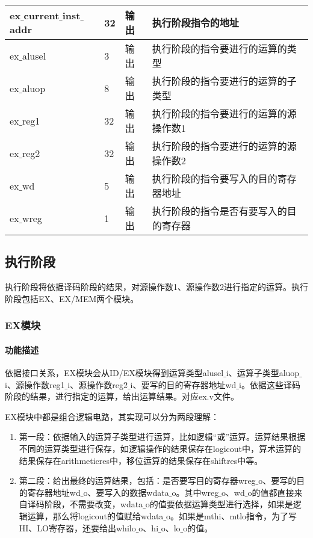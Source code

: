 \begin{longtable}{|l|l|l|l|}
		\hline
		ex$\_$current$\_$inst$\_$addr & 32 & 输出 & 执行阶段指令的地址 \\
		\hline
		ex$\_$alusel & 3 & 输出 & 执行阶段的指令要进行的运算的类型 \\
		\hline
		ex$\_$aluop & 8 & 输出 & 执行阶段的指令要进行的运算的子类型 \\
		\hline
		ex$\_$reg1 & 32 & 输出 & 执行阶段的指令要进行的运算的源操作数1 \\
		\hline
		ex$\_$reg2 & 32 & 输出 & 执行阶段的指令要进行的运算的源操作数2 \\
		\hline
		ex$\_$wd & 5 & 输出 & 执行阶段的指令要写入的目的寄存器地址 \\
		\hline
		ex$\_$wreg & 1 & 输出 & 执行阶段的指令是否有要写入的目的寄存器 \\
		\hline
	\end{longtable}
\subsection{执行阶段}
执行阶段将依据译码阶段的结果，对源操作数1、源操作数2进行指定的运算。执行阶段包括EX、EX/MEM两个模块。
\subsubsection{EX模块}
\paragraph{功能描述}
\quad

\quad

依据接口关系，EX模块会从ID/EX模块得到运算类型alusel$\_$i、运算子类型aluop$\_$i、源操作数reg1$\_$i、源操作数reg2$\_$i、要写的目的寄存器地址wd$\_$i。依据这些译码阶段的结果，进行指定的运算，给出运算结果。对应ex.v文件。

EX模块中都是组合逻辑电路，其实现可以分为两段理解：
\begin{enumerate}[(1)]
	\item 第一段：依据输入的运算子类型进行运算，比如逻辑“或”运算。运算结果根据不同的运算类型进行保存，如逻辑操作的结果保存在logicout中，算术运算的结果保存在arithmeticres中，移位运算的结果保存在shiftres中等。
	
	\item 第二段：给出最终的运算结果，包括：是否要写目的寄存器wreg$\_$o、要写的目的寄存器地址wd$\_$o、要写入的数据wdata$\_$o。其中wreg$\_$o、wd$\_$o的值都直接来自译码阶段，不需要改变，wdata$\_$o的值要依据运算类型进行选择，如果是逻辑运算，那么将logicout的值赋给wdata$\_$o。如果是mthi、mtlo指令，为了写HI、LO寄存器，还要给出whilo$\_$o、hi$\_$o、lo$\_$o的值。
\end{enumerate}

